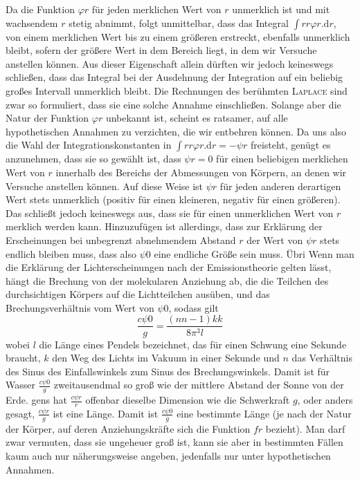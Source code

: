 Da die Funktion $\varphi r$ für jeden merklichen Wert von $r$ unmerklich ist und mit wachsendem $r$ stetig abnimmt, folgt unmittelbar, dass das Integral $\int rr\varphi r.\mathrm{d}r$, von einem merklichen Wert bis zu einem größeren erstreckt, ebenfalls unmerklich bleibt, sofern der größere Wert in dem Bereich liegt, in dem wir Versuche anstellen können. Aus dieser Eigenschaft allein dürften wir jedoch keineswegs schließen, dass das Integral bei der Ausdehnung der Integration auf ein beliebig großes Intervall unmerklich bleibt. Die Rechnungen des berühmten \textsc{Laplace} sind zwar so formuliert, dass sie eine solche Annahme einschließen. Solange aber die Natur der Funktion $\varphi r$ unbekannt ist, scheint es ratsamer, auf alle hypothetischen Annahmen zu verzichten, die wir entbehren können. Da uns also die Wahl der Integrationskonstanten in $\int rr\varphi r.\mathrm{d}r=-\psi r$ freisteht, genügt es anzunehmen, dass sie so gewählt ist, dass $\psi r=0$ für einen beliebigen merklichen Wert von $r$ innerhalb des Bereichs der Abmessungen von Körpern, an denen wir Versuche anstellen können. Auf diese Weise ist $\psi r$ für jeden anderen derartigen Wert stets unmerklich (positiv für einen kleineren, negativ für einen größeren). Das schließt jedoch keineswegs aus, dass sie für einen unmerklichen Wert von $r$ merklich werden kann. Hinzuzufügen ist allerdings, dass zur Erklärung der Erscheinungen bei unbegrenzt abnehmendem Abstand $r$ der Wert von $\psi r$ stets endlich bleiben muss, dass also $\psi0$ eine endliche Größe sein muss. Übri%
\newcommand{\NearTau}{\mathord{\text{\fontspec{Liberation Serif}τ}}}%
\expandafter\def\csname HistoricalNoteText6\endcsname{Wenn man die Erklärung der Lichterscheinungen nach der Emissionstheorie gelten lässt, hängt die Brechung von der molekularen Anziehung ab, die die Teilchen des durchsichtigen Körpers auf die Lichtteilchen ausüben, und das Brechungsverhältnis vom Wert von $\psi0$, sodass gilt
\[
\frac{c\psi0}{g}=\frac{(nn-1)kk}{8\pi^3l}
\]
wobei $l$ die Länge eines Pendels bezeichnet, das für einen Schwung eine Sekunde braucht, $k$ den Weg des Lichts im Vakuum in einer Sekunde und $n$ das Verhältnis des Sinus des Einfallswinkels zum Sinus des Brechungswinkels. Damit ist für Wasser $\frac{c\psi0}{g}$ zweitausendmal so groß wie der mittlere Abstand der Sonne von der Erde.}%
gens hat $\frac{c\psi r}{r}$ offenbar dieselbe Dimension wie die Schwerkraft $g$, oder anders gesagt, $\frac{c\psi r}{g}$ ist eine Länge. Damit ist $\frac{c\psi0}{g}$ eine bestimmte Länge (je nach der Natur der Körper, auf deren Anziehungskräfte sich die Funktion $fr$ bezieht). Man darf zwar vermuten, dass sie ungeheuer groß ist, kann sie aber in bestimmten Fällen kaum auch nur näherungsweise angeben, jedenfalls nur unter hypothetischen Annahmen.

